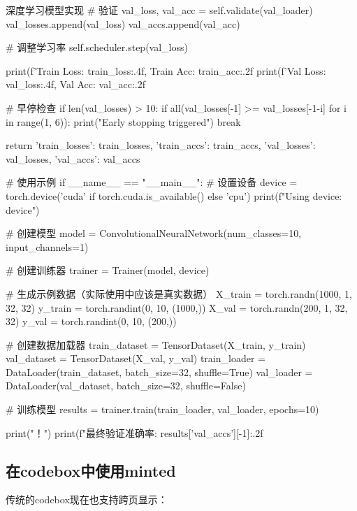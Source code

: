 \begin{longcodebox}[python]{深度学习模型实现}
            # 验证
            val_loss, val_acc = self.validate(val_loader)
            val_losses.append(val_loss)
            val_accs.append(val_acc)
            
            # 调整学习率
            self.scheduler.step(val_loss)
            
            print(f'Train Loss: {train_loss:.4f}, Train Acc: {train_acc:.2f}%
            print(f'Val Loss: {val_loss:.4f}, Val Acc: {val_acc:.2f}%
            
            # 早停检查
            if len(val_losses) > 10:
                if all(val_losses[-1] >= val_losses[-1-i] for i in range(1, 6)):
                    print("Early stopping triggered")
                    break
        
        return {
            'train_losses': train_losses,
            'train_accs': train_accs,
            'val_losses': val_losses,
            'val_accs': val_accs
        }

# 使用示例
if __name__ == "__main__":
    # 设置设备
    device = torch.device('cuda' if torch.cuda.is_available() else 'cpu')
    print(f"Using device: {device}")
    
    # 创建模型
    model = ConvolutionalNeuralNetwork(num_classes=10, input_channels=1)
    
    # 创建训练器
    trainer = Trainer(model, device)
    
    # 生成示例数据（实际使用中应该是真实数据）
    X_train = torch.randn(1000, 1, 32, 32)
    y_train = torch.randint(0, 10, (1000,))
    X_val = torch.randn(200, 1, 32, 32)
    y_val = torch.randint(0, 10, (200,))
    
    # 创建数据加载器
    train_dataset = TensorDataset(X_train, y_train)
    val_dataset = TensorDataset(X_val, y_val)
    train_loader = DataLoader(train_dataset, batch_size=32, shuffle=True)
    val_loader = DataLoader(val_dataset, batch_size=32, shuffle=False)
    
    # 训练模型
    results = trainer.train(train_loader, val_loader, epochs=10)
    
    print("！")
    print(f"最终验证准确率: {results['val_accs'][-1]:.2f}%
\end{longcodebox}

\subsection{在codebox中使用minted}

传统的codebox现在也支持跨页显示：

